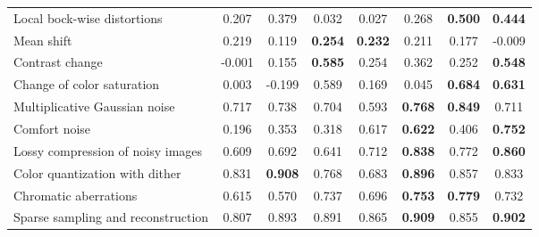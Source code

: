 \documentclass[journal]{IEEEtran}
\begin{document}
\begin{table*}[t]
\begin{tabular}{l|cccccc|c}
            Local bock-wise distortions & 0.207 & 0.379 & 0.032 & 0.027 & 0.268 & {\bf 0.500} & {\bf 0.444} \\
            Mean shift & 0.219 & 0.119 & {\bf 0.254} & {\bf 0.232}  & 0.211 & 0.177 & -0.009 \\
            Contrast change & -0.001 & 0.155 & {\bf 0.585} & 0.254 & 0.362 & 0.252 & {\bf 0.548} \\
            Change of color saturation & 0.003 & -0.199 & 0.589 & 0.169 & 0.045 & {\bf 0.684} & {\bf 0.631} \\
            Multiplicative Gaussian noise & 0.717 & 0.738 & 0.704 & 0.593 & {\bf 0.768} & {\bf 0.849} & 0.711 \\
            Comfort noise & 0.196 & 0.353 & 0.318 & 0.617 & {\bf 0.622} & 0.406 & {\bf 0.752} \\
            Lossy compression of noisy images & 0.609 & 0.692 & 0.641 & 0.712 & {\bf 0.838} & 0.772 & {\bf 0.860} \\
            Color quantization with dither & 0.831 & {\bf 0.908} & 0.768 & 0.683 & {\bf 0.896} & 0.857 & 0.833 \\
            Chromatic aberrations & 0.615 & 0.570 & 0.737 & 0.696 & {\bf 0.753} & {\bf 0.779} & 0.732 \\
            Sparse sampling and reconstruction  & 0.807 & 0.893 & 0.891 & 0.865 & {\bf 0.909} & 0.855 & {\bf 0.902} \\
     \bottomrule
   \end{tabular}
\end{table*}

\end{document}
